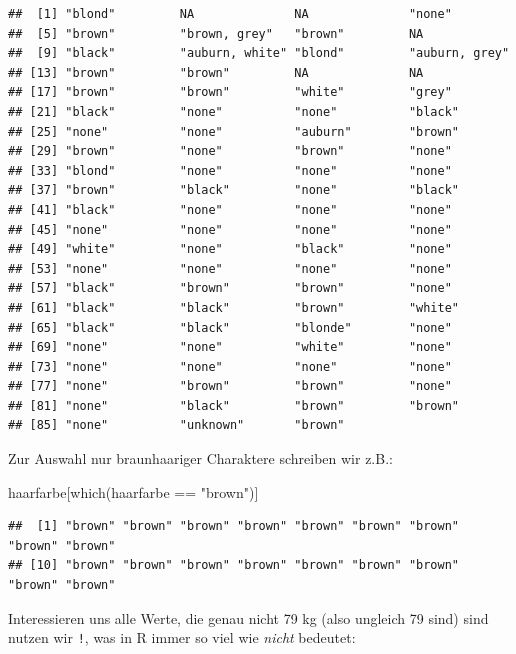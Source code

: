 \documentclass[
]{book}
\newenvironment{Shaded}{\begin{snugshade}}{\end{snugshade}}
\newcommand{\FunctionTok}[1]{\textcolor[rgb]{0.00,0.00,0.00}{#1}}
\newcommand{\NormalTok}[1]{#1}
\newcommand{\SpecialCharTok}[1]{\textcolor[rgb]{0.00,0.00,0.00}{#1}}
\newcommand{\StringTok}[1]{\textcolor[rgb]{0.31,0.60,0.02}{#1}}
\begin{document}
\begin{verbatim}
##  [1] "blond"         NA              NA              "none"         
##  [5] "brown"         "brown, grey"   "brown"         NA             
##  [9] "black"         "auburn, white" "blond"         "auburn, grey" 
## [13] "brown"         "brown"         NA              NA             
## [17] "brown"         "brown"         "white"         "grey"         
## [21] "black"         "none"          "none"          "black"        
## [25] "none"          "none"          "auburn"        "brown"        
## [29] "brown"         "none"          "brown"         "none"         
## [33] "blond"         "none"          "none"          "none"         
## [37] "brown"         "black"         "none"          "black"        
## [41] "black"         "none"          "none"          "none"         
## [45] "none"          "none"          "none"          "none"         
## [49] "white"         "none"          "black"         "none"         
## [53] "none"          "none"          "none"          "none"         
## [57] "black"         "brown"         "brown"         "none"         
## [61] "black"         "black"         "brown"         "white"        
## [65] "black"         "black"         "blonde"        "none"         
## [69] "none"          "none"          "white"         "none"         
## [73] "none"          "none"          "none"          "none"         
## [77] "none"          "brown"         "brown"         "none"         
## [81] "none"          "black"         "brown"         "brown"        
## [85] "none"          "unknown"       "brown"
\end{verbatim}

Zur Auswahl nur braunhaariger Charaktere schreiben wir z.B.:

\begin{Shaded}
\begin{Highlighting}[]
\NormalTok{haarfarbe[}\FunctionTok{which}\NormalTok{(haarfarbe }\SpecialCharTok{==} \StringTok{"brown"}\NormalTok{)]}
\end{Highlighting}
\end{Shaded}

\begin{verbatim}
##  [1] "brown" "brown" "brown" "brown" "brown" "brown" "brown" "brown" "brown"
## [10] "brown" "brown" "brown" "brown" "brown" "brown" "brown" "brown" "brown"
\end{verbatim}

Interessieren uns alle Werte, die genau nicht 79 kg (also ungleich 79 sind) sind nutzen wir \texttt{!}, was in R immer so viel wie \emph{nicht} bedeutet:
\end{document}
